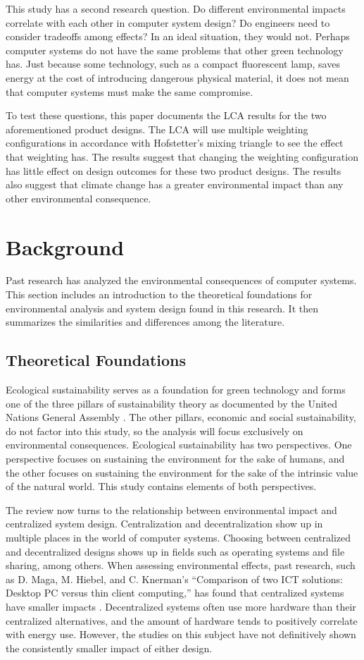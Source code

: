 \documentclass[final,journal,10pt,letterpaper,oneside,twocolumn,compsoc]%
{IEEEtran}
\begin{document}
This study has a second research question. Do different environmental impacts
correlate with each other in computer system
design? Do engineers need to consider tradeoffs among effects? In an ideal
situation, they would not. Perhaps computer systems do not have the same
problems that other green technology has. Just because some technology, such as
a compact fluorescent lamp, saves energy at the cost of introducing dangerous
physical material, it
does not mean that computer systems must make the same compromise.

To test these questions, this paper documents the LCA results for the two
aforementioned product designs. The LCA will use multiple weighting
configurations in accordance with Hofstetter's mixing triangle to see the effect
that weighting has. The results suggest that changing the weighting
configuration has little effect on design outcomes for these two product
designs. The
results also suggest that climate change has a greater environmental impact than
any other environmental consequence.

\section{Background}
Past research has analyzed the
environmental consequences of computer systems. This
section includes an
introduction to the theoretical foundations for environmental analysis and
system design found in this research. It then summarizes the similarities and
differences among the literature.

\subsection{Theoretical Foundations}
Ecological sustainability serves as a foundation for green technology and
forms one of the three pillars of sustainability theory as documented by the
United Nations General Assembly
\cite{un}. The other pillars, economic and social sustainability, do not factor
into this study, so the analysis will focus exclusively on environmental
consequences. Ecological sustainability has two perspectives. One perspective
focuses on sustaining the environment for the sake of humans, and the other
focuses on sustaining the environment for the sake of the intrinsic value of the
natural world. This study contains elements of both perspectives.

The review now turns to the relationship between environmental impact and
centralized system design.
Centralization and decentralization show up in multiple places in the world of
computer systems. Choosing between centralized and decentralized designs shows
up in fields such as operating systems and file sharing, among others. When
assessing
environmental effects, past research, such as D. Maga, M. Hiebel, and C.
Knerman's ``Comparison of two ICT solutions: Desktop PC versus thin client
computing,'' has found that centralized systems have smaller impacts
\cite{maga}. Decentralized systems often use more hardware than their
centralized alternatives, and the amount of hardware tends to positively
correlate with energy use. However, the studies on this subject have not
definitively shown the consistently smaller impact of either design.
\end{document}
